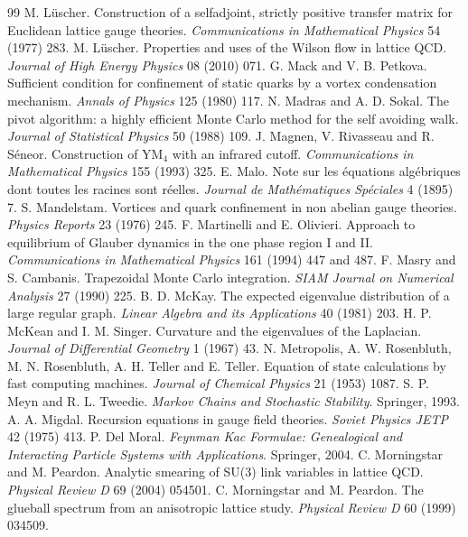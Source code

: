\begin{thebibliography}{99}
 M. L\"uscher. Construction of a selfadjoint, strictly positive transfer matrix for Euclidean lattice gauge theories. \emph{Communications in Mathematical Physics} 54 (1977) 283.
 M. L\"uscher. Properties and uses of the Wilson flow in lattice QCD. \emph{Journal of High Energy Physics} 08 (2010) 071.
 G. Mack and V. B. Petkova. Sufficient condition for confinement of static quarks by a vortex condensation mechanism. \emph{Annals of Physics} 125 (1980) 117.
 N. Madras and A. D. Sokal. The pivot algorithm: a highly efficient Monte Carlo method for the self avoiding walk. \emph{Journal of Statistical Physics} 50 (1988) 109.
 J. Magnen, V. Rivasseau and R. S\'eneor. Construction of YM$_4$ with an infrared cutoff. \emph{Communications in Mathematical Physics} 155 (1993) 325.
 E. Malo. Note sur les \'equations alg\'ebriques dont toutes les racines sont r\'eelles. \emph{Journal de Math\'ematiques Sp\'eciales} 4 (1895) 7.
 S. Mandelstam. Vortices and quark confinement in non abelian gauge theories. \emph{Physics Reports} 23 (1976) 245.
 F. Martinelli and E. Olivieri. Approach to equilibrium of Glauber dynamics in the one phase region I and II. \emph{Communications in Mathematical Physics} 161 (1994) 447 and 487.
 F. Masry and S. Cambanis. Trapezoidal Monte Carlo integration. \emph{SIAM Journal on Numerical Analysis} 27 (1990) 225.
 B. D. McKay. The expected eigenvalue distribution of a large regular graph. \emph{Linear Algebra and its Applications} 40 (1981) 203.
 H. P. McKean and I. M. Singer. Curvature and the eigenvalues of the Laplacian. \emph{Journal of Differential Geometry} 1 (1967) 43.
 N. Metropolis, A. W. Rosenbluth, M. N. Rosenbluth, A. H. Teller and E. Teller. Equation of state calculations by fast computing machines. \emph{Journal of Chemical Physics} 21 (1953) 1087.
 S. P. Meyn and R. L. Tweedie. \emph{Markov Chains and Stochastic Stability}. Springer, 1993.
 A. A. Migdal. Recursion equations in gauge field theories. \emph{Soviet Physics JETP} 42 (1975) 413.
 P. Del Moral. \emph{Feynman Kac Formulae: Genealogical and Interacting Particle Systems with Applications}. Springer, 2004.
 C. Morningstar and M. Peardon. Analytic smearing of SU(3) link variables in lattice QCD. \emph{Physical Review D} 69 (2004) 054501.
 C. Morningstar and M. Peardon. The glueball spectrum from an anisotropic lattice study. \emph{Physical Review D} 60 (1999) 034509.

\end{thebibliography}

